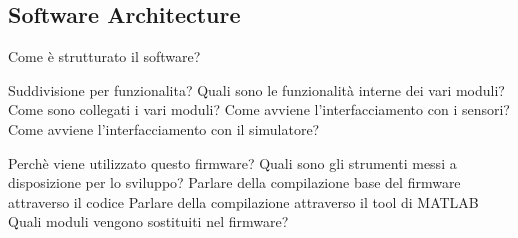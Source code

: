 \begin{en}
	\section{Software Architecture}
	Come è strutturato il software?
	
	Suddivisione per funzionalita?
	Quali sono le funzionalità interne dei vari moduli?
	Come sono collegati i vari moduli?
	Come avviene l'interfacciamento con i sensori?
	Come avviene l'interfacciamento con il simulatore?
	
	Perchè viene utilizzato questo firmware?
	Quali sono gli strumenti messi a disposizione per lo sviluppo?
	Parlare della compilazione base del firmware attraverso il codice
	Parlare della compilazione attraverso il tool di MATLAB 
	Quali moduli vengono sostituiti nel firmware?
\end{en}